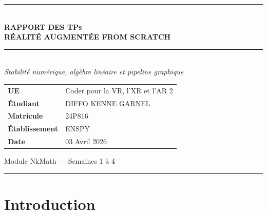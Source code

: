 \documentclass[11pt,a4paper]{article}
\begin{document}
\thispagestyle{empty}

\begin{titlepage}
    \centering
    \vspace*{1.5cm}

    {\color{mainblue}\rule{\textwidth}{2pt}}\\[0.4cm]

    {\fontsize{26}{32}\selectfont\bfseries\color{mainblue} RAPPORT DES TPs}\\[0.3cm]
    {\large\bfseries\color{accentblue} RÉALITÉ AUGMENTÉE FROM SCRATCH}\\[0.5cm]

    {\color{mainblue}\rule{\textwidth}{2pt}}\\[1.2cm]

    {\large\itshape\color{darkgray} Stabilité numérique, algèbre linéaire et pipeline graphique}\\[2cm]

    \begin{mdframed}[style=formulabox]
    \renewcommand{\arraystretch}{1.5}
    \begin{tabular}{@{}ll}
        \textbf{UE} & Coder pour la VR, l'XR et l'AR 2 \\
        \textbf{Étudiant} & DIFFO KENNE GARNEL \\
        \textbf{Matricule} & 24P816 \\
        \textbf{Établissement} & ENSPY \\
        \textbf{Date} & 03 Avril 2026 \\
    \end{tabular}
    \end{mdframed}

    \vfill

    {\small\color{darkgray} Module NkMath — Semaines 1 à 4}\\[0.5cm]
    {\color{mainblue}\rule{\textwidth}{1pt}}
\end{titlepage}

\newpage
\tableofcontents
\newpage

\section{Introduction}
\end{document}
